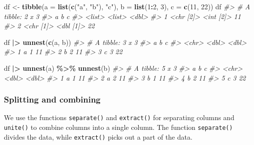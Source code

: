 \documentclass[
]{book}
\newenvironment{Shaded}{\begin{snugshade}}{\end{snugshade}}
\newcommand{\AttributeTok}[1]{\textcolor[rgb]{0.13,0.29,0.53}{#1}}
\newcommand{\CommentTok}[1]{\textcolor[rgb]{0.56,0.35,0.01}{\textit{#1}}}
\newcommand{\DecValTok}[1]{\textcolor[rgb]{0.00,0.00,0.81}{#1}}
\newcommand{\FunctionTok}[1]{\textcolor[rgb]{0.13,0.29,0.53}{\textbf{#1}}}
\newcommand{\NormalTok}[1]{#1}
\newcommand{\OtherTok}[1]{\textcolor[rgb]{0.56,0.35,0.01}{#1}}
\newcommand{\SpecialCharTok}[1]{\textcolor[rgb]{0.81,0.36,0.00}{\textbf{#1}}}
\newcommand{\StringTok}[1]{\textcolor[rgb]{0.31,0.60,0.02}{#1}}
\begin{document}
\begin{Shaded}
\begin{Highlighting}[]
\NormalTok{df }\OtherTok{\textless{}{-}} \FunctionTok{tibble}\NormalTok{(}\AttributeTok{a =} \FunctionTok{list}\NormalTok{(}\FunctionTok{c}\NormalTok{(}\StringTok{"a"}\NormalTok{, }\StringTok{"b"}\NormalTok{), }\StringTok{"c"}\NormalTok{),}
             \AttributeTok{b =} \FunctionTok{list}\NormalTok{(}\DecValTok{1}\SpecialCharTok{:}\DecValTok{2}\NormalTok{, }\DecValTok{3}\NormalTok{),}
             \AttributeTok{c =} \FunctionTok{c}\NormalTok{(}\DecValTok{11}\NormalTok{, }\DecValTok{22}\NormalTok{))}
\NormalTok{df}
\CommentTok{\#\textgreater{} \# A tibble: 2 x 3}
\CommentTok{\#\textgreater{}   a         b             c}
\CommentTok{\#\textgreater{}   \textless{}list\textgreater{}    \textless{}list\textgreater{}    \textless{}dbl\textgreater{}}
\CommentTok{\#\textgreater{} 1 \textless{}chr [2]\textgreater{} \textless{}int [2]\textgreater{}    11}
\CommentTok{\#\textgreater{} 2 \textless{}chr [1]\textgreater{} \textless{}dbl [1]\textgreater{}    22}
  
\NormalTok{df }\SpecialCharTok{|\textgreater{}} \FunctionTok{unnest}\NormalTok{(}\FunctionTok{c}\NormalTok{(a, b))}
\CommentTok{\#\textgreater{} \# A tibble: 3 x 3}
\CommentTok{\#\textgreater{}   a         b     c}
\CommentTok{\#\textgreater{}   \textless{}chr\textgreater{} \textless{}dbl\textgreater{} \textless{}dbl\textgreater{}}
\CommentTok{\#\textgreater{} 1 a         1    11}
\CommentTok{\#\textgreater{} 2 b         2    11}
\CommentTok{\#\textgreater{} 3 c         3    22}

\NormalTok{df }\SpecialCharTok{|\textgreater{}} \FunctionTok{unnest}\NormalTok{(a) }\SpecialCharTok{\%\textgreater{}\%} \FunctionTok{unnest}\NormalTok{(b)}
\CommentTok{\#\textgreater{} \# A tibble: 5 x 3}
\CommentTok{\#\textgreater{}   a         b     c}
\CommentTok{\#\textgreater{}   \textless{}chr\textgreater{} \textless{}dbl\textgreater{} \textless{}dbl\textgreater{}}
\CommentTok{\#\textgreater{} 1 a         1    11}
\CommentTok{\#\textgreater{} 2 a         2    11}
\CommentTok{\#\textgreater{} 3 b         1    11}
\CommentTok{\#\textgreater{} 4 b         2    11}
\CommentTok{\#\textgreater{} 5 c         3    22}
\end{Highlighting}
\end{Shaded}

\subsubsection{Splitting and combining}\label{splitting-and-combining}

We use the functions \texttt{separate()} and \texttt{extract()} for separating columns and \texttt{unite()} to combine columns into a single column. The function \texttt{separate()} divides the data, while \texttt{extract()} picks out a part of the data.
\end{document}
